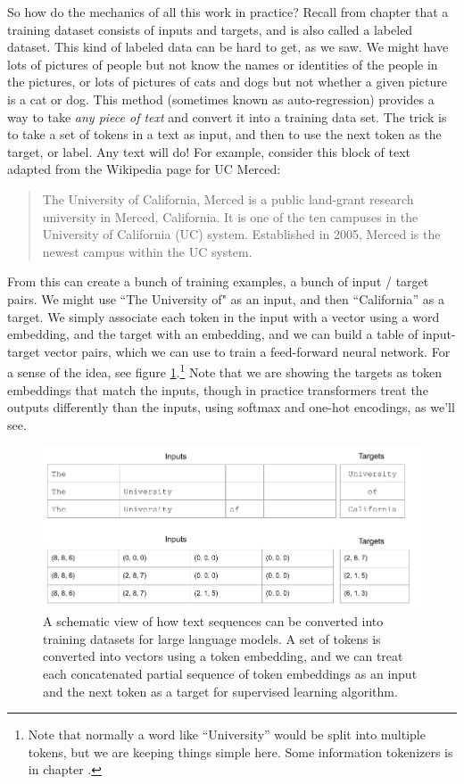 So how do the mechanics of all this work in practice? Recall from chapter  that a training dataset consists of inputs and targets, and is also called a labeled dataset. This kind of labeled data can be hard to get, as we saw.  We might have lots of pictures of people but not know the names or identities of the people in the pictures, or lots of pictures of cats and dogs but not whether a given picture is a cat or dog.  This method (sometimes known as auto-regression) provides a way to take \emph{any piece of text} and convert it into a training data set. The trick is to take a set of tokens in a text as input, and then to use the next token as the target, or label.  Any text will do! For example, consider this block of text adapted from the Wikipedia page for UC Merced:

\begin{quote}
The University of California, Merced is a public land-grant research university in Merced, California. It is one of the ten campuses in the University of California (UC) system. Established in 2005, Merced is the newest campus within the UC system.
\end{quote}

From this can create a bunch of training examples, a bunch of input / target pairs. We might use ``The University of" as an input, and then ``California'' as a target.  We simply associate each token in the input with a vector using a word embedding, and the target with an embedding, and we can build a table of input-target vector pairs, which we can use to train a feed-forward neural network.  For a sense of the idea, see figure \ref{nextWordPrediction}.\footnote{Note that normally a word like ``University'' would be split into multiple tokens, but we are keeping things simple here. Some information tokenizers is in chapter .}  Note that we are showing the targets as token embeddings that match the inputs, though in practice transformers treat the outputs differently than the inputs, using softmax and one-hot encodings, as we'll see.

\begin{figure}[h]
\centering
\includegraphics[scale=.45]{./images/nextWordPrediction.png}
\caption[Jeff Yoshimi]{A schematic view of how text sequences can be converted into training datasets for large language models. A set of tokens is converted into vectors using a token embedding, and we can treat each concatenated partial sequence of token embeddings as an input and the next token as a target for supervised learning algorithm. }
\label{nextWordPrediction}
\end{figure}
  

